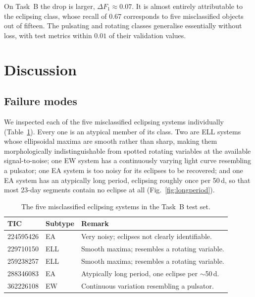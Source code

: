 \documentclass{aa}
\begin{document}
    On Task~B the drop is larger, $\Delta F_1 \approx 0.07$. It is almost entirely
    attributable to the eclipsing class, whose recall of 0.67 corresponds to five
    misclassified objects out of fifteen. The pulsating and rotating classes generalise
    essentially without loss, with test metrics within $0.01$ of their validation values.



    \section{Discussion}
    \label{sec:discussion}

    \subsection{Failure modes}

    We inspected each of the five misclassified eclipsing systems individually
    (Table~\ref{tab:misclass}). Every one is an atypical member of its class. Two are ELL
    systems whose ellipsoidal maxima are smooth rather than sharp, making them
    morphologically indistinguishable from spotted rotating variables at the available
    signal-to-noise; one EW system has a continuously varying light curve resembling a
    pulsator; one EA system is too noisy for its eclipses to be recovered; and one EA system
    has an atypically long period, eclipsing roughly once per 50\,d, so that most 23-day
    segments contain no eclipse at all (Fig.~\ref{fig:longperiod}).

    \begin{table}[!t]
        \caption{The five misclassified eclipsing systems in the Task~B test set.}
        \label{tab:misclass}
        \centering
        \small
        \begin{tabular}{llp{4.2cm}}
            \toprule
            TIC       & Subtype & Remark                                               \\
            \midrule
            224595426 & EA      & Very noisy; eclipses not clearly identifiable.       \\
            229710150 & ELL     & Smooth maxima; resembles a rotating variable.        \\
            259238257 & ELL     & Smooth maxima; resembles a rotating variable.        \\
            288346083 & EA      & Atypically long period, one eclipse per $\sim$50\,d. \\
            362226108 & EW      & Continuous variation resembling a pulsator.          \\
            \bottomrule
        \end{tabular}
    \end{table}
\end{document}
